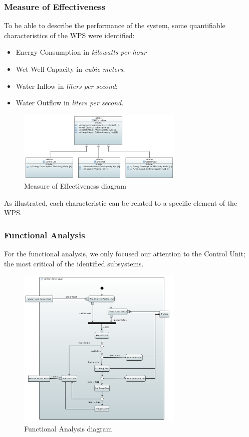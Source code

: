 \documentclass[11pt]{article}
\begin{document}
\subsubsection{Measure of Effectiveness}

To be able to describe the performance of the system, some quantifiable characteristics of the WPS were identified:

\begin{itemize}
\setlength\itemsep{0em}
  \item Energy Consumption in \textit{kilowatts per hour}
  \item Wet Well Capacity in \textit{cubic meters};
  \item Water Inflow in \textit{liters per second};
  \item Water Outflow in \textit{liters per second}.
\end{itemize}

\begin{figure}[H]
  \centering
  \includegraphics[width=300px]{../diagrams/measure-of-effectiveness.png}
  \caption{Measure of Effectiveness diagram}
  \label{fig:MoE}
\end{figure}

As illustrated, each characteristic can be related to a specific element of the WPS.

\subsubsection{Functional Analysis}

For the functional analysis, we only focused our attention to the Control Unit; the most critical of the identified subsystems.

\begin{figure}[H]
  \centering
  \includegraphics[width=300px]{../diagrams/functional-analysis-wps.png}
  \caption{Functional Analysis diagram}
  \label{fig:Functional Analysis}
\end{figure}
\end{document}
